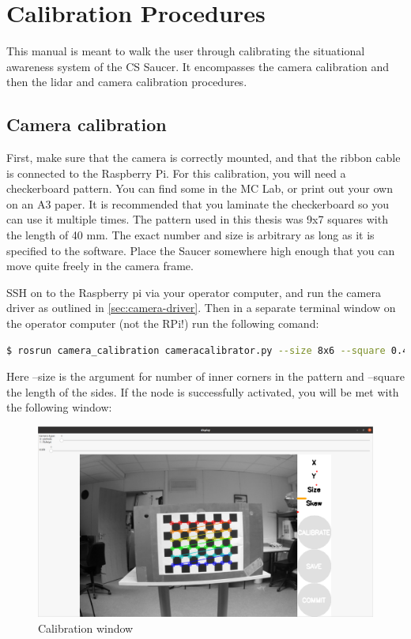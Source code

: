 \chapter{Calibration Procedures}

This manual is meant to walk the user through calibrating the situational awareness system of the CS Saucer. It encompasses the camera calibration and then the lidar and camera calibration procedures. 

\section{Camera calibration}

First, make sure that the camera is correctly mounted, and that the ribbon cable is connected to the Raspberry Pi. For this calibration, you will need a checkerboard pattern. You can find some in the MC Lab, or print out your own on an A3 paper. It is recommended that you laminate the checkerboard so you can use it multiple times. The pattern used in this thesis was 9x7 squares with the length of 40 mm. The exact number and size is arbitrary as long as it is specified to the software. Place the Saucer somewhere high enough that you can move quite freely in the camera frame. 

SSH on to the Raspberry pi via your operator computer, and run the camera driver as outlined in \cref{sec:camera-driver}. Then in a separate terminal window on the operator computer (not the RPi!) run the following comand:

\begin{lstlisting}[language=bash]
$ rosrun camera_calibration cameracalibrator.py --size 8x6 --square 0.40 image:=/cv_camera/raw_image camera:=/cv_camera
\end{lstlisting}

Here --size is the argument for number of inner corners in the pattern and --square the length of the sides. If the node is successfully activated, you will be met with the following window: 

\begin{figure}[H]
    \centering
    \includegraphics[width=\textwidth]{Images/camera-calibration.png}
    \caption{Calibration window}
    \label{fig:calibration-window}
\end{figure}

